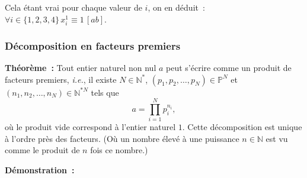     Cela étant vrai pour chaque valeur de $i$, on en déduit : $\forall i \in \lbrace 1, 2, 3, 4 \rbrace \, x_i^1 \equiv 1 \, [a b]$.

\done


\subsubsection{Décomposition en facteurs premiers}
\label{subsub:dec_fact_prem}

\bigskip

\noindent\textbf{Théorème :} 
Tout entier naturel non nul $a$ peut s'écrire comme un produit de facteurs premiers, \textit{i.e.}, il existe $N \in \mathbb{N}^*$, $\left( p_1, p_2, \dots, p_N \right) \in \mathbb{P}^{N}$ et $\left( n_1, n_2, \dots, n_N \right) \in \mathbb{N}^{* N}$ tels que
\begin{equation*}
    a = \prod_{i=1}^N p_i^{n_i},
\end{equation*}
où le produit vide correspond à l'entier naturel $1$.
Cette décomposition est unique à l'ordre près des facteurs. 
(Où un nombre élevé à une puissance $n \in \mathbb{N}$ est vu comme le produit de $n$ fois ce nombre.)

\medskip

\noindent\textbf{Démonstration :} 


